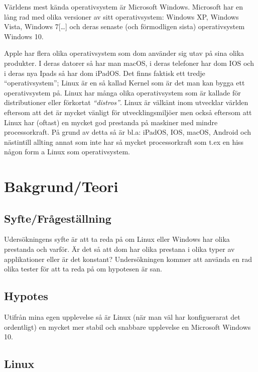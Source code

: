 \documentclass[12pt, a4paper]{report}
\begin{document}
   Världens mest kända operativsystem\cite{winstat} är Microsoft Windows. Microsoft har en lång rad med olika versioner av sitt operativsystem\cite{windows}: Windows XP, Windows Vista, Windows 7[\dots] och deras senaste (och förmodligen sista) operativsystem Windows 10.
    
   Apple har flera olika operativsystem\cite{appleOS} som dom använder sig utav på sina olika produkter. I deras datorer så har man macOS, i deras telefoner har dom IOS och i deras nya Ipads så har dom iPadOS.
    Det finns faktisk ett tredje ``operativsystem''; Linux är en så kallad Kernel \cite{redhat} som är det man kan bygga ett operativsystem på. Linux har många olika operativsystem som är kallade för distributioner eller förkortat \textit{``distros''}. Linux är välkänt inom utvecklar världen eftersom att det är mycket vänligt för utvecklingsmiljöer men också eftersom att Linux har (oftast) en mycket god prestanda på maskiner med mindre processorkraft\cite{whatislinux}. På grund av detta så är bl.a: iPadOS, IOS, macOS, Android och nästintill allting annat som inte har så mycket processorkraft som t.ex en hiss någon form a Linux som operativsystem.
    
    \section{Bakgrund/Teori}


    \subsection{Syfte/Frågeställning}
    Udersökningens syfte är att ta reda på om Linux eller Windows har olika prestanda och varför. Är det så att dom har olika prestana i olika typer av applikationer eller är det konstant? Undersökningen kommer att använda en rad olika tester för att ta reda på om hypotesen är san.
 

    \subsection{Hypotes}

    Utifrån mina egen upplevelse så är Linux (när man väl har konfiguerarat det ordentligt) en mycket mer stabil och snabbare upplevelse en Microsoft Windows 10.
 

    \subsection{Linux}
 
\end{document}
